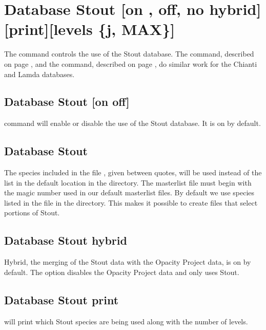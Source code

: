 \section{Database Stout [on , off, no hybrid][print][levels \{j, MAX\}]}
\label{sec:SetStout}
The command controls the use of the Stout database.
The  command, described on page \pageref{sec:SetChianti},
and the  command, described on page \pageref{sec:SetLamda},
do similar work for the Chianti and Lamda databases.

\subsection{Database Stout [on off]} 
command will enable or disable the use of the Stout database.
It is on by default.

\subsection{Database Stout }
The species included in the file , given between quotes, will be used
instead of the list in the default location in the  directory.
The masterlist file must begin with the magic number used in our default masterlist files.
By default we use species listed in the  file in the 
 directory.
This makes it possible to create  files that select portions of Stout.

\subsection{Database Stout hybrid} 
Hybrid, the merging of the Stout data with the Opacity Project data, 
is on by default.
The  option disables the Opacity Project data 
and only uses Stout.

\subsection{Database Stout print} 
will print which Stout species are being used
along with the number of levels.

